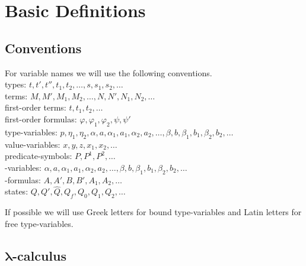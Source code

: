 \section{Basic Definitions}\label{sec.2}
\subsection{Conventions}
For variable names we will use the following conventions.\\
\lambdaTwo{} types: $t, t', t'', t_1, t_2, \dots,s,s_1,s_2,\dots$\\
\lambdaTwo{} terms: $M, M', M_1, M_2,\dots, N, N', N_1, N_2, \dots$\\
first-order terms: $t,t_1, t_2,\dots$\\
first-order formulas: $\varphi,\varphi_1,\varphi_2,\psi,\psi'$\\
type-variables: $p,\eta_1,\eta_2,\alpha, a,\alpha_1, a_1,\alpha_2,a_2, \dots, \beta, b,\beta_1,b_1,\beta_2,b_2, \dots$\\
value-variables: $x,y,z, x_1 , x_2 ,\dots$\\
predicate-symbols: $P,P^1,P^2,\dots$\\
\SysP-variables: $\alpha, a,\alpha_1, a_1,\alpha_2,a_2, \dots, \beta, b,\beta_1,b_1,\beta_2,b_2, \dots$\\
\SysP-formulas: $A,A' ,B,B',A_1,A_2,\dots$\\
states: $Q,Q',\widehat{Q},Q_f,Q_0,Q_1,Q_2,\dots$

If possible we will use Greek letters for bound type-variables and Latin letters for free type-variables.
\subsection{$\boldsymbol{\lambda}$-calculus \lambdaTwo{}}

